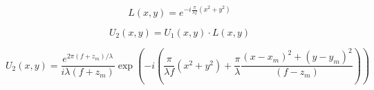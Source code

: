 \documentclass{kepfl}
\begin{document}
\begin{equation}
	L(x,y) = {e^{ - i\frac{\pi }{{\lambda f}}({x^2} + {y^2})}}
\end{equation}

\begin{equation}
{U_2}(x,y) = {U_1}(x,y) \cdot L(x,y)
\end{equation}

\begin{equation}
{U_2}(x,y) = \frac{{{e^{2\pi (f + {z_m})/\lambda }}}}{{i\lambda (f + {z_m})}}\exp \left( { - i\left( {\frac{\pi }{{\lambda f}}({x^2} + {y^2}) + \frac{\pi }{\lambda }\frac{{{{(x - {x_m})}^2} + {{(y - {y_m})}^2}}}{{(f - {z_m})}}} \right)} \right)
\end{equation}
\end{document}

